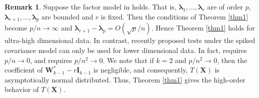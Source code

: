 \documentclass[12pt]{article} %
\newcommand{\bX}{\mathbf{X}}
\newcommand{\bI}{\mathbf{I}}
\newcommand{\bW}{\mathbf{W}}
\newcommand{\bfsym}[1]{\ensuremath{\boldsymbol{#1}}}
\def\blambda {\bfsym {\lambda}}
\theoremstyle{definition}
\newtheorem{remark}{Remark}
\begin{document}
\begin{remark}
    Suppose the factor model in \cite{Ma2015A} holds. That is, $\blambda_1,\ldots, \blambda_r$ are of order $p$, $\blambda_{r+1},\ldots, \blambda_p$ are bounded and $r$ is fixed.
    Then the conditions of Theorem \ref{thm1} become $p/n\to \infty$ and $\blambda_{r+1}-\blambda_p=O(\sqrt p /n)$.
    Hence Theorem \ref{thm1} holds for ultra-high dimensional data.
    In contrast, recently proposed tests under the spiked covariance model can only be used for lower dimensional data.
    In fact, \cite{Aoshima2018} requires $p/n \to 0$, and \cite{WANG2018225} requires $p/n^2\to 0$.   
    We note that if $k=2$ and $p/n^2 \to 0$, then the coefficient of $\bW_{k-1}^* - r\bI_{k-1}$ is negligible, and consequently, $T(\bX)$ is asymptotically normal distributed.
    Thus, Theorem \ref{thm1} gives the high-order behavior of $T(\bX)$.

\end{remark}
\end{document}
